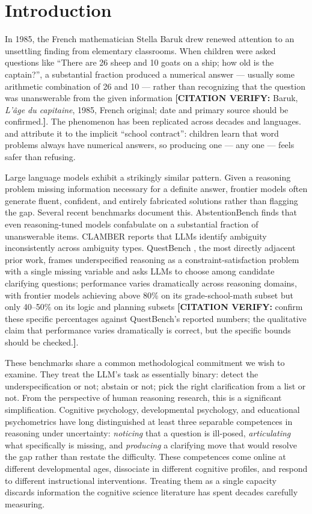 \documentclass[11pt,letterpaper]{article}
\newcommand{\citeverify}[1]{{\color{orange}\textbf{[CITATION VERIFY:} #1\textbf{]}}}
\begin{document}
\section{Introduction}

In 1985, the French mathematician Stella Baruk drew renewed attention to an unsettling finding from elementary classrooms. When children were asked questions like ``There are 26 sheep and 10 goats on a ship; how old is the captain?'', a substantial fraction produced a numerical answer --- usually some arithmetic combination of 26 and 10 --- rather than recognizing that the question was unanswerable from the given information \citeverify{Baruk, \emph{L'\^age du capitaine}, 1985, French original; date and primary source should be confirmed.}. The phenomenon has been replicated across decades and languages. \citet{verschaffel2000} and \citet{reusser1997} attribute it to the implicit ``school contract'': children learn that word problems always have numerical answers, so producing one --- any one --- feels safer than refusing.

Large language models exhibit a strikingly similar pattern. Given a reasoning problem missing information necessary for a definite answer, frontier models often generate fluent, confident, and entirely fabricated solutions rather than flagging the gap. Several recent benchmarks document this. AbstentionBench \citep{wen2025} finds that even reasoning-tuned models confabulate on a substantial fraction of unanswerable items. CLAMBER \citep{zhang2024clamber} reports that LLMs identify ambiguity inconsistently across ambiguity types. QuestBench \citep{li2025questbench}, the most directly adjacent prior work, frames underspecified reasoning as a constraint-satisfaction problem with a single missing variable and asks LLMs to choose among candidate clarifying questions; performance varies dramatically across reasoning domains, with frontier models achieving above 80\% on its grade-school-math subset but only 40--50\% on its logic and planning subsets \citeverify{confirm these specific percentages against QuestBench's reported numbers; the qualitative claim that performance varies dramatically is correct, but the specific bounds should be checked.}.

These benchmarks share a common methodological commitment we wish to examine. They treat the LLM's task as essentially binary: detect the underspecification or not; abstain or not; pick the right clarification from a list or not. From the perspective of human reasoning research, this is a significant simplification. Cognitive psychology, developmental psychology, and educational psychometrics have long distinguished at least three separable competences in reasoning under uncertainty: \emph{noticing} that a question is ill-posed, \emph{articulating} what specifically is missing, and \emph{producing} a clarifying move that would resolve the gap rather than restate the difficulty. These competences come online at different developmental ages, dissociate in different cognitive profiles, and respond to different instructional interventions. Treating them as a single capacity discards information the cognitive science literature has spent decades carefully measuring.
\end{document}
